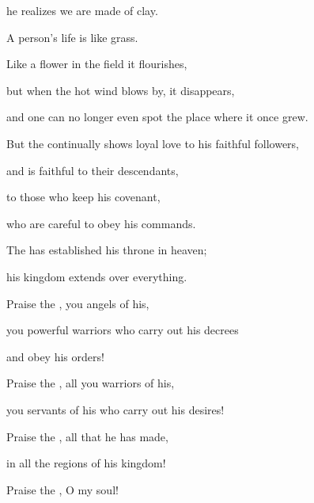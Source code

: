 {\par }{\Q he realizes
we are made of clay.
\par }{\Q {}A person’s
life
is like grass.
\par }{\Q Like a flower
in the field
it flourishes,
\par }{\Q {}but when
the hot wind
blows by,
it disappears,
\par }{\Q and one can
no
longer
even spot
the place where it once grew.
\par }{\Q {}But the
{}
continually
shows loyal love
to his faithful followers,
\par }{\Q and is faithful
to their descendants,
\par }{\Q {}to those who keep
his covenant,
\par }{\Q who are careful
to obey
his commands.
\par }{\Q {}The
{}
has established
his throne
in heaven;
\par }{\Q his kingdom
extends
over everything.
\par }{\Q {}Praise
the {}, you angels
of his,
\par }{\Q you powerful
warriors
who carry
out his decrees
\par }{\Q and obey
his orders!
\par }{\Q {}Praise
the {}, all
you warriors
of his,

\par }{\Q you servants
of his who carry
out his desires!
\par }{\Q {}Praise
the {}, all
that he has made,
\par }{\Q in all
the regions
of his kingdom!
\par }{\Q Praise
the {}, O my soul!


}
